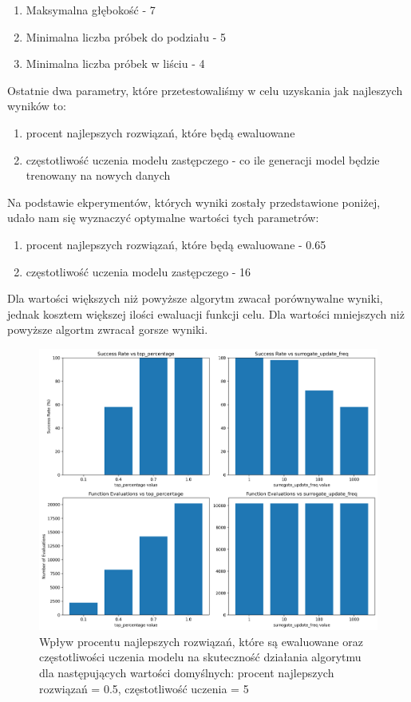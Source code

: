 \documentclass{article}
\begin{document}
\begin{enumerate}
    \item Maksymalna głębokość - 7
    \item Minimalna liczba próbek do podziału - 5
    \item Minimalna liczba próbek w liściu - 4
\end{enumerate}

Ostatnie dwa parametry, które przetestowaliśmy w celu uzyskania jak najleszych wyników to:
\begin{enumerate}
    \item procent najlepszych rozwiązań, które będą ewaluowane
    \item częstotliwość uczenia modelu zastępczego - co ile generacji model będzie trenowany na nowych danych
\end{enumerate}

Na podstawie ekperymentów, których wyniki zostały przedstawione poniżej, udało nam się wyznaczyć optymalne wartości tych parametrów:
\begin{enumerate}
    \item procent najlepszych rozwiązań, które będą ewaluowane - 0.65
    \item częstotliwość uczenia modelu zastępczego - 16
\end{enumerate}

Dla wartości większych niż powyższe algorytm zwacał porównywalne wyniki, jednak kosztem większej ilości ewaluacji funkcji celu. Dla wartości mniejszych niż powyższe algortm zwracał gorsze wyniki.

\begin{figure}[H]
    \centering
    \includegraphics[width=\textwidth]{surrogate_de_parameter_tuning_results1.png}
    \caption{Wpływ procentu najlepszych rozwiązań, które są ewaluowane oraz częstotliwości uczenia modelu na skuteczność działania algorytmu dla następujących wartości domyślnych: procent najlepszych rozwiązań = 0.5, częstotliwość uczenia = 5}
    \label{fig:surogate_de_parameter_results1}
\end{figure}
\end{document}
